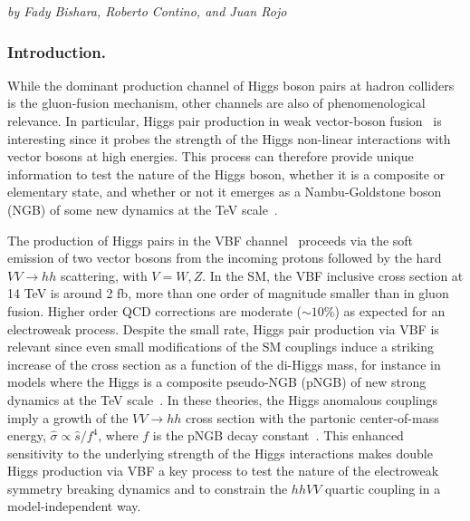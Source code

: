 \textit{by Fady Bishara, Roberto Contino, and Juan Rojo}

\newcommand{\gsim}{\gtrsim}
\newcommand{\lsim}{\lesssim}
\newcommand{\la}{\left\langle}
\newcommand{\ra}{\right\rangle}
\newcommand{\lc}{\left[}
\newcommand{\rc}{\right]}
\newcommand{\lp}{\left(}
\newcommand{\rp}{\right)}
\newcommand{\eps}{\varepsilon}
\newcommand{\mcL}{\mathcal{L}}
\newcommand{\mcO}{\mathcal{O}}
\newcommand{\mcP}{\mathcal{P}}
\newcommand{\pyth}{\texttt{Pythia8}~}
\newcommand{\sher}{\texttt{Sherpa}~}
\newcommand{\alpg}{\texttt{ALPGEN}~}
\newcommand{\amcnlo}{{\tt MadGraph5\_aMC@NLO}~}
\newcommand{\cv}{c_V}
\newcommand{\cvv}{c_{2V}}
\newcommand{\ccc}{c_3}
\newcommand{\dcvv}{\delta_{\cvv}}
\newcommand{\dccc}{\delta_{\ccc}}

\subsubsection{Introduction.}
%
While the dominant production channel of Higgs boson pairs at hadron colliders is the gluon-fusion mechanism, other channels are also of phenomenological relevance. In particular, Higgs pair production in weak vector-boson fusion~\cite{Bishara:2016kjn} is interesting since it probes the
strength of the  Higgs non-linear interactions with vector bosons at high
energies. This process can therefore provide unique information
to test the nature of the Higgs boson,
whether it is a composite or elementary state, and whether or not it emerges as
a Nambu-Goldstone boson (NGB) of some new dynamics at the TeV
scale~\cite{Giudice:2007fh,Contino:2010mh,Contino:2013gna}.

The production of Higgs pairs in the  VBF
channel~\cite{Giudice:2007fh,Contino:2010mh,Dolan:2013rja,Brooijmans:2014eja,Liu-Sheng:2014gxa,Dolan:2015zja} proceeds via the soft emission of two vector bosons from the incoming protons  followed by 
the hard $VV \to hh$ scattering, with $V=W,Z$.
%
In the SM, the VBF inclusive cross section
at 14 TeV is around 2 fb, more than one
order of magnitude smaller than in gluon fusion.
Higher order QCD corrections are moderate ($\sim 10\%$) as
expected for an electroweak process.
%
Despite the small rate, Higgs pair production via VBF is relevant since
even small modifications of the SM couplings induce a striking increase of the
cross section as a function of the di-Higgs mass, for instance in models 
where the Higgs is a composite pseudo-NGB (pNGB) of new strong dynamics at the TeV scale~\cite{Kaplan:1983fs}.
%
In these theories, the Higgs anomalous couplings imply a growth of the $VV\to hh$ cross section with the
partonic center-of-mass energy, $\hat{\sigma} \propto \hat s/f^4$, where $f$ is the pNGB decay constant~\cite{Giudice:2007fh}.
%
This enhanced sensitivity to the underlying strength of the Higgs interactions makes 
double Higgs production via VBF a key process to test the nature of the
electroweak symmetry breaking dynamics
and to constrain the $hhVV$ quartic coupling in a model-independent way.

